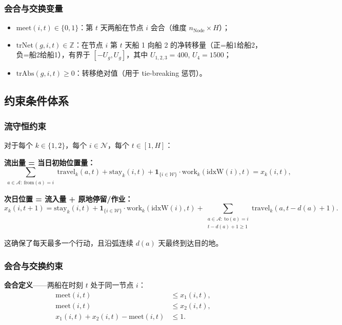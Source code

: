 \subsubsection{会合与交换变量}
\begin{itemize}
    \item $\text{meet}(i,t)\in\{0,1\}$：第 $t$ 天两船在节点 $i$ 会合（维度 $n_{\text{Node}}\times H$）；
    \item $\text{trNet}(g,i,t)\in\mathbb{Z}$：在节点 $i$ 第 $t$ 天船 1 向船 2 的净转移量（正=船1给船2，负=船2给船1），有界于 $[-U_g, U_g]$，其中 $U_{1,2,3}=400$, $U_4=1500$；
    \item $\text{trAbs}(g,i,t)\geq0$：转移绝对值（用于 tie-breaking 惩罚）。
\end{itemize}

\subsection{约束条件体系}

\subsubsection{流守恒约束}

对于每个 $k\in\{1,2\}$，每个 $i\in\mathcal{N}$，每个 $t\in[1,H]$：

\textbf{流出量 = 当日初始位置量：}
\begin{equation}
\sum_{\substack{a\in\mathcal{A}:\ \mathrm{from}(a)=i}} \text{travel}_k(a,t) + \text{stay}_k(i,t) + \mathbf{1}_{\{i\in\mathcal{W}\}}\cdot \text{work}_k(\mathrm{idxW}(i),t) = x_k(i,t),
\end{equation}

\textbf{次日位置 = 流入量 + 原地停留/作业：}
\begin{equation}\label{eq:q4_flow_next}
x_k(i,t+1) = \text{stay}_k(i,t) + \mathbf{1}_{\{i\in\mathcal{W}\}}\cdot \text{work}_k(\mathrm{idxW}(i),t) + \sum_{\substack{a\in\mathcal{A}:\ \mathrm{to}(a)=i\\ t-d(a)+1\geq 1}} \text{travel}_k(a, t-d(a)+1).
\end{equation}

这确保了每天最多一个行动，且沿弧连续 $d(a)$ 天最终到达目的地。

\subsubsection{会合与交换约束}

\textbf{会合定义}——两船在时刻 $t$ 处于同一节点 $i$：
\begin{equation}
\begin{aligned}
\text{meet}(i,t) &\leq x_1(i,t),\\
\text{meet}(i,t) &\leq x_2(i,t),\\
x_1(i,t) + x_2(i,t) - \text{meet}(i,t) &\leq 1.
\end{aligned}
\end{equation}

